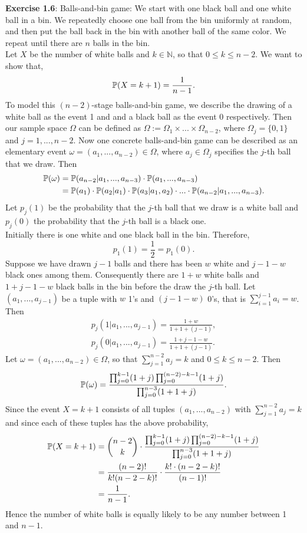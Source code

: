 \textbf{Exercise 1.6}: Balls-and-bin game: We start with one black ball and one
white ball in a bin. We repeatedly choose one ball from the bin uniformly at
random, and then put the ball back in the bin with another ball of the same color.
We repeat until there are $n$ balls in the bin. \\[0,2cm]
Let $X$ be the number of white balls and $k \in \mathbb{N}$, so that $0 \leq k
\leq n-2$. We want to show that,
\[ \mathbb{P}(X=k+1) = \frac{1}{n-1}. \]
To model this $(n-2)$-stage balls-and-bin game, we describe the drawing of a white
ball as the event 1 and and a black ball as the event 0 respectively. Then our
sample space $\Omega$ can be defined as $\Omega := \Omega_1 \times ... \times
\Omega_{n-2}$, where $\Omega_j = \{ 0, 1\}$ and $j = 1,...,n-2$. Now one concrete
balls-and-bin game can be described as an elementary event $\omega =
(a_1,...,a_{n-2}) \in \Omega$, where $a_j \in \Omega_j$ specifies the $j$-th ball
that we draw. Then
\begin{align*}
  \mathbb{P}(\omega)
    &= \mathbb{P}(a_{n-2}| a_1,...,a_{n-3}) \cdot \mathbb{P}(a_1,...,a_{n-3}) \\
    &= \mathbb{P}(a_1) \cdot \mathbb{P}(a_2| a_1) \cdot \mathbb{P}(a_3| a_1,a_2) \cdot ... \cdot \mathbb{P}(a_{n-2}| a_1,...,a_{n-3}).
\end{align*}
Let $p_j(1)$ be the probability that the $j$-th ball that we draw is
a white ball and $p_j(0)$ the probability that the $j$-th ball is a black one. \\
Initially there is one white and one black ball in the bin. Therefore,
\[ p_1(1) = \frac{1}{2} = p_1(0). \]
Suppose we have drawn $j-1$ balls and there has been $w$ white and $j-1-w$ black
ones among them. Consequently there are $1 + w$ white balls and $1 + j - 1 - w$
black balls in the bin before the draw the $j$-th ball. Let
$\left(a_1,...,a_{j-1}\right)$ be a tuple with $w$ 1's and $(j-1-w)$ 0's, that is
$\sum_{i=1}^{j-1}a_i = w$. Then
\begin{align*}
    p_j(1|a_1,...,a_{j-1}) = \frac{1 + w}{1 + 1 + (j-1)}, \\
    p_j(0|a_1,...,a_{j-1}) = \frac{1+j-1-w}{1 + 1 + (j-1)}.
\end{align*}
Let $\omega = (a_1, ..., a_{n-2}) \in \Omega$, so that $\sum_{j=1}^{n-2}a_j = k$
and $0 \leq k \leq n-2$. Then
\[
  \mathbb{P}(\omega) = \frac {\prod_{j=0}^{k-1}(1 + j) \prod_{j=0}^{(n-2)-k-1}(1 + j)}
                      {\prod_{j=0}^{n-3}(1+1+j)}.
\]
Since the event $X=k+1$ consists of all tuples $(a_1,...,a_{n-2})$ with
$\sum_{j=1}^{n-2}a_j = k$ and since each of these tuples has the above probability,
\begin{align*}
  \mathbb{P}(X=k+1)
    &= \binom{n-2}{k} \cdot \frac {\prod_{j=0}^{k-1}(1 + j) \prod_{j=0}^{(n-2)-k-1}(1 + j)}{\prod_{j=0}^{n-3}(1+1+j)} \\
    &= \frac{(n-2)!}{k! (n-2-k)!} \cdot \frac{k! \cdot (n-2-k)!}{(n-1)!} \\
    &= \frac{1}{n-1}.
\end{align*}
Hence the number of white balls is equally likely to be any number between 1 and
$n-1$.

